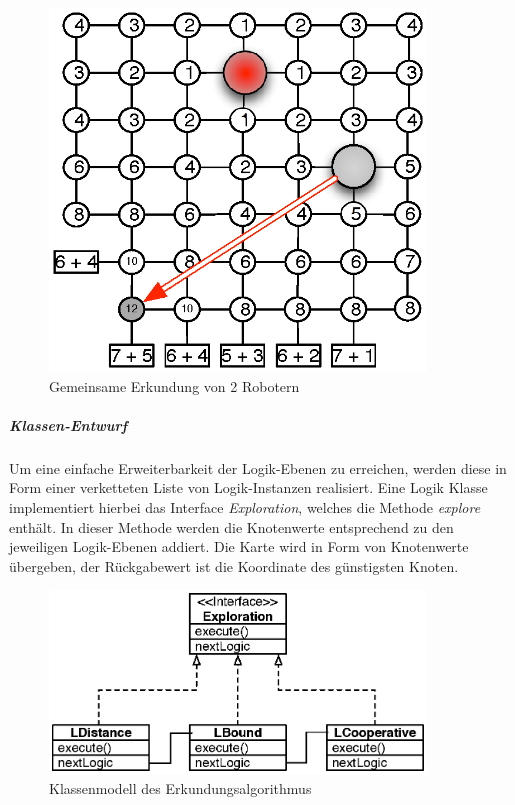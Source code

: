 \documentclass[10pt,a4paper]{article}
\begin{document}
					\begin{figure}[h]
						\centering
						\includegraphics[width=10cm]{images/kooperation.eps}
  						\caption{Gemeinsame Erkundung von 2 Robotern}
  						\label{fig:level2}
  					\end{figure} 
  				\subparagraph*{Klassen-Entwurf} Um eine einfache Erweiterbarkeit der Logik-Ebenen zu erreichen, werden diese in Form einer
  					verketteten Liste von Logik-Instanzen realisiert. Eine Logik Klasse implementiert hierbei das Interface \textit{Exploration}, welches
  					die Methode \textit{explore} enthält. In dieser Methode werden die Knotenwerte entsprechend zu den jeweiligen Logik-Ebenen
  					addiert. Die Karte wird in Form von Knotenwerte übergeben, der Rückgabewert ist die Koordinate des günstigsten Knoten.
 					\begin{figure}[h]
						\centering
						\includegraphics[width=10cm]{images/exploration_design.eps}
  						\caption{Klassenmodell des Erkundungsalgorithmus}
  						\label{fig:klassen_modell}
  					\end{figure} 
\end{document}
